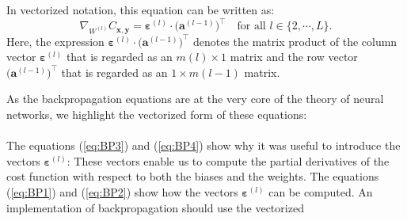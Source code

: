 In vectorized notation, this equation can be written as:
\begin{equation}
  \label{eq:BP4v}
  \nabla_{W^{(l)}} C_{\mathbf{x}, \mathbf{y}} = \boldsymbol{\varepsilon}^{(l)} \cdot \bigl(\mathbf{a}^{(l-1)}\bigr)^\top
  \quad \mbox{for all $l \in \{2, \cdots,L\}$.}
  \tag{BP4v}
\end{equation}
Here, the expression $\boldsymbol{\varepsilon}^{(l)} \cdot \bigl(\mathbf{a}^{(l-1)}\bigr)^\top$ denotes the matrix
product of the column vector $\boldsymbol{\varepsilon}^{(l)}$ that is regarded as an $m(l) \times 1$ matrix and the
row vector $\bigl(\mathbf{a}^{(l-1)}\bigr)^\top$ that is regarded as an $1 \times m(l-1)$ matrix.

As the backpropagation equations  are at the very core of the theory of neural
networks, we highlight the vectorized form of these equations:
\\[0.2cm]
\hspace*{0.3cm}
\colorbox{red}{}
\\[0.2cm]
The equations (\ref{eq:BP3}) and (\ref{eq:BP4}) show why it was useful to introduce the
vectors $\boldsymbol{\varepsilon}^{(l)}$: These vectors enable us to compute the partial derivatives of the cost function
with respect to both the biases and the weights.  The equations (\ref{eq:BP1}) and (\ref{eq:BP2})
show how the vectors $\boldsymbol{\varepsilon}^{(l)}$ can be computed.  An implementation of backpropagation should use the vectorized

